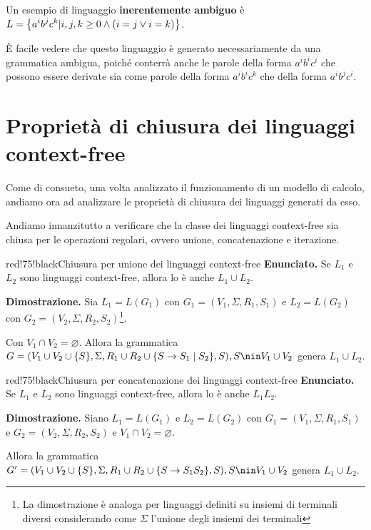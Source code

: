 Un esempio di linguaggio \textbf{inerentemente ambiguo} è $L = \displaystyle{\left\{{a^{i}b^{j}c^{k} \vert i,j,k \geq 0 \land (i=j \lor i=k)}\right\}}$.

È facile vedere che questo linguaggio è generato necessariamente da una grammatica ambigua, poiché conterrà anche le parole della forma $a^{i}b^{i}c^{i}$ che possono essere derivate sia come parole della forma $a^{i}b^{i}c^{k}$ che della forma $a^{i}b^{j}c^{i}$.

\section{Proprietà di chiusura dei linguaggi context-free}

Come di consueto, una volta analizzato il funzionamento di un modello di calcolo, andiamo ora ad analizzare le proprietà di chiusura dei linguaggi generati da esso.

Andiamo innanzitutto a verificare che la classe dei linguaggi context-free sia chiusa per le operazioni regolari, ovvero unione, concatenazione e iterazione.

\begin{halfframedbox}{red!75!black}{Chiusura per unione dei linguaggi context-free}
  \textbf{Enunciato.} Se $L_1$ e $L_2$ sono linguaggi context-free, allora lo è anche $L_1 \cup L_2$.

  \begin{center}
    \textcolor{red!75!black}{\hdashrule[0.5ex]{18cm}{1pt}{3mm 3pt 1mm 2pt}}
  \end{center}

  \textbf{Dimostrazione.} Sia $L_1 = L(G_1)$ con $G_1 = (V_1, \Sigma, R_1, S_1)$ e $L_2 = L(G_2)$ con $G_2 = (V_2, \Sigma, R_2, S_2)$\footnote{La dimostrazione è analoga per linguaggi definiti su insiemi di terminali diversi considerando come $\Sigma$ l'unione degli insiemi dei terminali}.

  Con $V_1 \cap V_2 = \varnothing$. Allora la grammatica $ G = \rbrakets{V_1 \cup V_2 \cup \cbrakets{S}, \Sigma, R_1 \cup R_2 \cup \cbrakets{S \to S_1 \mid S_2}, S}, S \nin V_1\cup V_2 $ genera $L_1 \cup L_2$.
\end{halfframedbox}

\begin{halfframedbox}{red!75!black}{Chiusura per concatenazione dei linguaggi context-free}
  \textbf{Enunciato.} Se $L_1$ e $L_2$ sono linguaggi context-free, allora lo è anche $L_{1}L_{2}$.

  \begin{center}
    \textcolor{red!75!black}{\hdashrule[0.5ex]{18cm}{1pt}{3mm 3pt 1mm 2pt}}
  \end{center}

  \textbf{Dimostrazione.} Siano $L_1 = L(G_1)$ e $L_2=L(G_2) $ con $G_1 = (V_1, \Sigma, R_1, S_1)$ e $G_2 = (V_2, \Sigma, R_2, S_2)$ e $V_1 \cap V_2 = \varnothing $.

  Allora la grammatica $G' = \rbrakets{V_1 \cup V_2 \cup \cbrakets{S}, \Sigma, R_1 \cup R_2 \cup \cbrakets{S \to S_1S_2}, S}, S \nin V_1\cup V_2$ genera $L_1 \cup L_2$.
\end{halfframedbox}

